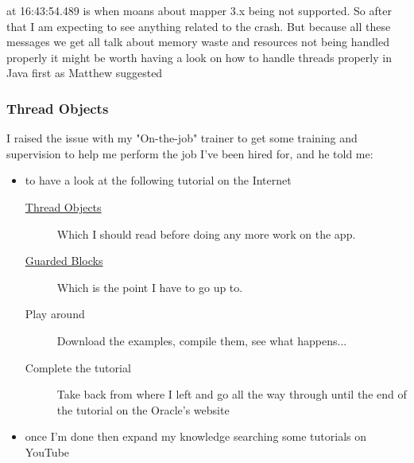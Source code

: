 \documentclass[a4paper,12pt]{book}
\begin{document}
at 16:43:54.489 is when moans about mapper 3.x being not supported. So after that I am expecting to see anything related to the crash. But because all these messages we get all talk about memory waste and resources not being handled properly it might be worth having a look on how to handle threads properly in Java first as Matthew suggested



\subsubsection{Thread Objects}
%
%
I raised the issue with my "On-the-job" trainer to get some training and supervision to help me perform the job I've been hired for, and he told me:

\begin{itemize}
\item{to have a look at the following tutorial on the Internet}

   \begin{description}
   \item[\href{https://docs.oracle.com/javase/tutorial/essential/concurrency/threads.html}{Thread Objects}]{Which I should read before doing any more work on the app.}
   \item[\href{https://docs.oracle.com/javase/tutorial/essential/concurrency/guardmeth.html}{Guarded Blocks}]{Which is the point I have to go up to.}
   \item[Play around]{Download the examples, compile them, see what happens...}
   \item[Complete the tutorial]{Take back from where I left and go all the way through until the end of the tutorial on the Oracle's website}
   \end{description}

\item{once I'm done then expand my knowledge searching some tutorials on YouTube}
\end{itemize}   
\end{document}
